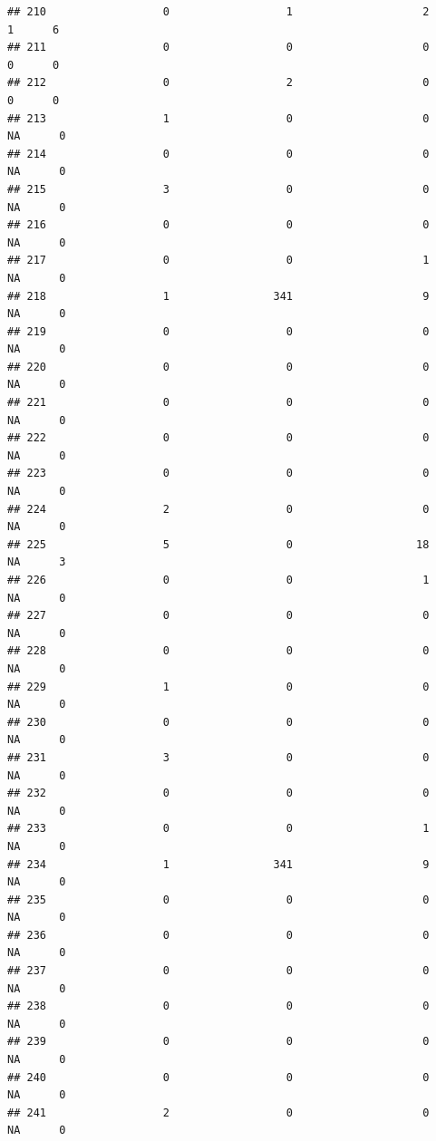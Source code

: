 \documentclass[
]{article}
\begin{document}
\begin{verbatim}
## 210                  0                  1                    2        1      6
## 211                  0                  0                    0        0      0
## 212                  0                  2                    0        0      0
## 213                  1                  0                    0       NA      0
## 214                  0                  0                    0       NA      0
## 215                  3                  0                    0       NA      0
## 216                  0                  0                    0       NA      0
## 217                  0                  0                    1       NA      0
## 218                  1                341                    9       NA      0
## 219                  0                  0                    0       NA      0
## 220                  0                  0                    0       NA      0
## 221                  0                  0                    0       NA      0
## 222                  0                  0                    0       NA      0
## 223                  0                  0                    0       NA      0
## 224                  2                  0                    0       NA      0
## 225                  5                  0                   18       NA      3
## 226                  0                  0                    1       NA      0
## 227                  0                  0                    0       NA      0
## 228                  0                  0                    0       NA      0
## 229                  1                  0                    0       NA      0
## 230                  0                  0                    0       NA      0
## 231                  3                  0                    0       NA      0
## 232                  0                  0                    0       NA      0
## 233                  0                  0                    1       NA      0
## 234                  1                341                    9       NA      0
## 235                  0                  0                    0       NA      0
## 236                  0                  0                    0       NA      0
## 237                  0                  0                    0       NA      0
## 238                  0                  0                    0       NA      0
## 239                  0                  0                    0       NA      0
## 240                  0                  0                    0       NA      0
## 241                  2                  0                    0       NA      0

\end{verbatim}
\end{document}
